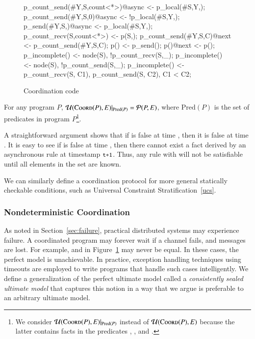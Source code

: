 \begin{figure}[h!]
\label{fig:coordcode}
\begin{Dedalus}
p_count_send(#Y,S,count<*>)@async <- p_local(#S,Y,);
p_count_send(#Y,S,0)@async <- !p_local(#S,Y,\dbar{_});
p_send(#Y,S,)@async <- p_local(#S,Y,);
p_count_recv(S,count<*>) <- p(S,);
p_count_send(#Y,S,C)@next <- p_count_send(#Y,S,C);
p() <- p_send();
p()@next <- p();
p_incomplete() <- node(S), !p_count_recv(S,_);
p_incomplete() <- node(S), !p_count_send(S,_);
p_incomplete() <- p_count_recv(S, C1),
                  p_count_send(S, C2), C1 < C2;
\end{Dedalus}
\caption{Coordination code}
\end{figure}

\begin{theorem}
For any program $P$, $\mathcal{U}(\textsc{Coord}(P), E)|_{\text{Pred}(P)} = \mathcal{P}(P, E)$, where $\text{Pred}(P)$ is the set of predicates in program $P$\footnote{We consider $\mathcal{U}(\textsc{Coord}(P), E)|_{\text{Pred}(P)}$ instead of $\mathcal{U}(\textsc{Coord}(P), E)$ because the latter contains facts in the predicates , , and .}.
\end{theorem}

A straightforward argument shows that if  is false at time , then it is false at time .  It is easy to see if  is false at time , then there cannot exist a  fact derived by an asynchronous rule at timestamp $\dedalus{t+1}$.  Thus, any rule with  will not be satisfiable until all elements in the  set are known.

We can similarly define a coordination protocol for more general statically checkable conditions, such as Universal Constraint Stratification~\ref{ucs}.

\subsubsection{Nondeterministic Coordination}
As noted in Section~\ref{sec:failure}, practical distributed systems may experience failure.  A coordinated program may forever wait if a channel fails, and messages are lost.  For example,  and  in Figure~\ref{fig:coordcode} may never be equal.  In these cases, the perfect model is unachievable.  In practice, exception handling techniques using timeouts are employed to write programs that handle such cases intelligently.  We define a generalization of the perfect ultimate model called a {\em consistently sealed ultimate model} that captures this notion in a way that we argue is preferable to an arbitrary ultimate model.

